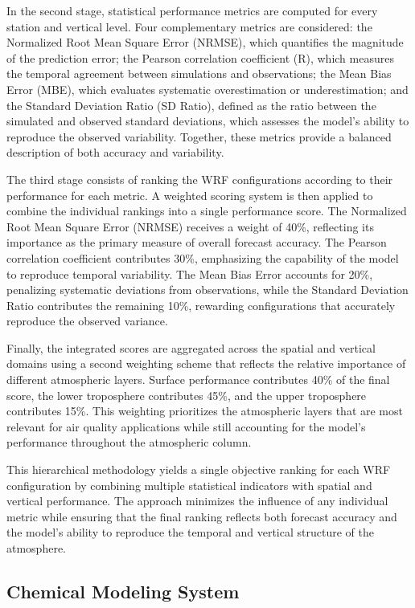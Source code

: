 \documentclass[
]{article}
\begin{document}
In the second stage, statistical performance metrics are computed for
every station and vertical level. Four complementary metrics are
considered: the Normalized Root Mean Square Error (NRMSE), which
quantifies the magnitude of the prediction error; the Pearson
correlation coefficient (R), which measures the temporal agreement
between simulations and observations; the Mean Bias Error (MBE), which
evaluates systematic overestimation or underestimation; and the Standard
Deviation Ratio (SD Ratio), defined as the ratio between the simulated
and observed standard deviations, which assesses the model's ability to
reproduce the observed variability. Together, these metrics provide a
balanced description of both accuracy and variability.

The third stage consists of ranking the WRF configurations according to
their performance for each metric. A weighted scoring system is then
applied to combine the individual rankings into a single performance
score. The Normalized Root Mean Square Error (NRMSE) receives a weight
of 40\%, reflecting its importance as the primary measure of overall
forecast accuracy. The Pearson correlation coefficient contributes 30\%,
emphasizing the capability of the model to reproduce temporal
variability. The Mean Bias Error accounts for 20\%, penalizing
systematic deviations from observations, while the Standard Deviation
Ratio contributes the remaining 10\%, rewarding configurations that
accurately reproduce the observed variance.

Finally, the integrated scores are aggregated across the spatial and
vertical domains using a second weighting scheme that reflects the
relative importance of different atmospheric layers. Surface performance
contributes 40\% of the final score, the lower troposphere contributes
45\%, and the upper troposphere contributes 15\%. This weighting
prioritizes the atmospheric layers that are most relevant for air
quality applications while still accounting for the model's performance
throughout the atmospheric column.

This hierarchical methodology yields a single objective ranking for each
WRF configuration by combining multiple statistical indicators with
spatial and vertical performance. The approach minimizes the influence
of any individual metric while ensuring that the final ranking reflects
both forecast accuracy and the model's ability to reproduce the temporal
and vertical structure of the atmosphere.

\subsection{\texorpdfstring{\textbf{Chemical Modeling
System}}{Chemical Modeling System}}\label{chemical-modeling-system}
\end{document}
